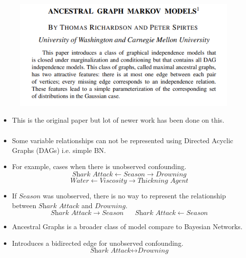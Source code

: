 \documentclass{beamer}
\begin{document}
\begin{frame}
	\frametitle{}
	\begin{figure}
		\includegraphics[scale=0.5]{imgs/mag.png}
	\end{figure}
	\begin{itemize}
		\item This is the original paper but lot of newer work has been done on this.
	\end{itemize}
\end{frame}
\begin{frame}
	\frametitle{}
	\begin{itemize}
		\item Some variable relationships can not be represented using Directed Acyclic Graphs (DAGs) i.e. simple BN.
		\item For example, cases when there is unobserved confounding.
			$$ \textit{Shark Attack} \leftarrow \textit{Season} \rightarrow \textit{Drowning} $$
			$$ \textit{Water} \leftarrow \textit{Viscosity} \rightarrow \textit{Thickning Agent} $$
		\item If $ \textit{Season} $ was unobserved, there is no way to represent the relationship between $ \textit{Shark Attack} $ and $ \textit{Drowning} $.
			$$ \textit{Shark Attack} \rightarrow \textit{Season} \;\;\;\;\;\; \textit{Shark Attack} \leftarrow \textit{Season} $$
		\item Ancestral Graphs is a broader class of model compare to Bayesian Networks.
		\item Introduces a bidirected edge for unobserved confounding.
			$$ \textit{Shark Attack} \leftrightarrow \textit{Drowning} $$
	\end{itemize}
\end{frame}
\end{document}
